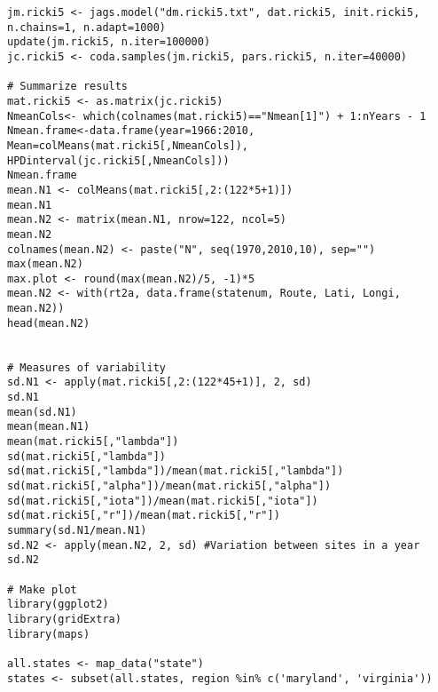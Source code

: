 \documentclass[12pt]{article}
\begin{document}
\begin{verbatim}
jm.ricki5 <- jags.model("dm.ricki5.txt", dat.ricki5, init.ricki5, n.chains=1, n.adapt=1000)
update(jm.ricki5, n.iter=100000)
jc.ricki5 <- coda.samples(jm.ricki5, pars.ricki5, n.iter=40000)

# Summarize results
mat.ricki5 <- as.matrix(jc.ricki5)
NmeanCols<- which(colnames(mat.ricki5)=="Nmean[1]") + 1:nYears - 1
Nmean.frame<-data.frame(year=1966:2010, Mean=colMeans(mat.ricki5[,NmeanCols]), HPDinterval(jc.ricki5[,NmeanCols]))
Nmean.frame
mean.N1 <- colMeans(mat.ricki5[,2:(122*5+1)])
mean.N1
mean.N2 <- matrix(mean.N1, nrow=122, ncol=5)
mean.N2
colnames(mean.N2) <- paste("N", seq(1970,2010,10), sep="")
max(mean.N2)
max.plot <- round(max(mean.N2)/5, -1)*5
mean.N2 <- with(rt2a, data.frame(statenum, Route, Lati, Longi, mean.N2))
head(mean.N2)


# Measures of variability
sd.N1 <- apply(mat.ricki5[,2:(122*45+1)], 2, sd)
sd.N1
mean(sd.N1)
mean(mean.N1)
mean(mat.ricki5[,"lambda"])
sd(mat.ricki5[,"lambda"])
sd(mat.ricki5[,"lambda"])/mean(mat.ricki5[,"lambda"])
sd(mat.ricki5[,"alpha"])/mean(mat.ricki5[,"alpha"])
sd(mat.ricki5[,"iota"])/mean(mat.ricki5[,"iota"])
sd(mat.ricki5[,"r"])/mean(mat.ricki5[,"r"])
summary(sd.N1/mean.N1)
sd.N2 <- apply(mean.N2, 2, sd) #Variation between sites in a year
sd.N2

# Make plot
library(ggplot2)
library(gridExtra)
library(maps)

all.states <- map_data("state")
states <- subset(all.states, region %in% c('maryland', 'virginia')) 


\end{verbatim}
\end{document}

